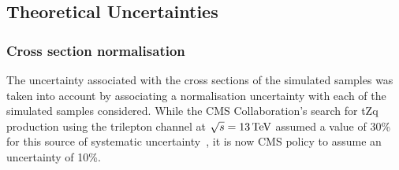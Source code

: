 %

%

\subsection{Theoretical Uncertainties}\label{sec:theorySysts}
\subsubsection{Cross section normalisation}
The uncertainty associated with the cross sections of the simulated samples was taken into account by associating a normalisation uncertainty with each of the simulated samples considered.
While the CMS Collaboration's search for tZq production using the trilepton channel at $\sqrt{s} = 13\,\text{Te\hspace{-.08em}V}$ assumed a value of 30\% for this source of systematic uncertainty~\cite{Sirunyan:2017nbr}, it is now CMS policy to assume an uncertainty of 10\%.

